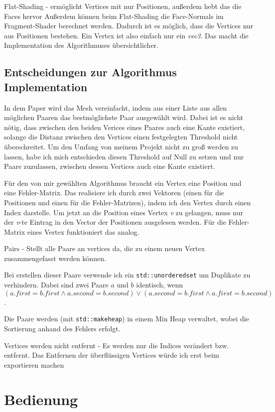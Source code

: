 \documentclass[a4paper,12pt]{book}
\begin{document}
Flat-Shading - ermöglicht Vertices mit nur Positionen, außerdem hebt das die Faces hervor
Außerdem können beim Flat-Shading die Face-Normals im Fragment-Shader berechnet werden. Dadurch ist es möglich, dass die Vertices nur aus Positionen bestehen. Ein Vertex ist also einfach nur ein \emph{vec3}. Das macht die Implementation des Algorithmuses übersichtlicher.


\subsection*{Entscheidungen zur Algorithmus Implementation}

In dem Paper wird das Mesh vereinfacht, indem aus einer Liste aus allen möglichen Paaren das bestmöglichste Paar ausgewählt wird. Dabei ist es nicht nötig, dass zwischen den beiden Verices eines Paares auch eine Kante existiert, solange die Distanz zwischen den Vertices einen festgelegten Threshold nicht überschreitet. 
Um den Umfang von meinem Projekt nicht zu groß werden zu lassen, habe ich mich entschieden diesen Threshold auf Null zu setzen und nur Paare zuzulassen, zwischen dessen Vertices auch eine Kante existiert. 

Für den von mir gewählten Algorithmus braucht ein Vertex eine Position und eine Fehler-Matrix. 
Das realisiere ich durch zwei Vektoren (einen für die Positionen und einen für die Fehler-Matrizen), indem ich den Vertex durch einen Index darstelle. 
Um jetzt an die Position eines Vertex \emph{v} zu gelangen, muss nur der \emph{v}-te Eintrag in den Vector der Positionen ausgelesen werden. Für die Fehler-Matrix eines Vertex funktioniert das analog.

Pairs - Stellt alle Paare an vertices da, die zu einem neuen Vertex zusammengefasst werden können. 

Bei erstellen dieser Paare verwende ich ein \texttt{std::unordered\textunderscore set} um Duplikate zu verhindern.
Dabei sind zwei Paare $a$ und $b$ identisch, wenn $(a.first=b.first \land a.second=b.second) \lor (a.second=b.first \land a.first=b.second)$. 

Die Paare werden (mit \texttt{std::make\textunderscore heap}) in einem Min Heap verwaltet, wobei die Sortierung anhand des Fehlers erfolgt.

Vertices werden nicht entfernt - Es werden nur die Indices verändert bzw. entfernt. Das Entfernen der überflüssigen Vertices würde ich erst beim exportieren machen

\section*{Bedienung}
\end{document}
